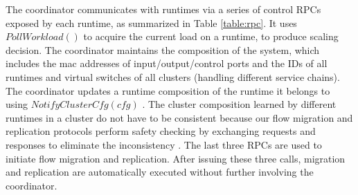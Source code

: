 The coordinator communicates with runtimes via a series of control RPCs exposed by each runtime, as summarized in Table \ref{table:rpc}. It uses $PollWorkload()$ to acquire the current load on a runtime, to produce scaling decision. The coordinator maintains the composition of the system, which includes the mac addresses of input/output/control ports and the IDs of all runtimes and virtual switches of all clusters (handling different service chains). The coordinator updates a runtime composition of the runtime it belongs to using $NotifyClusterCfg(cfg)$ . The cluster composition learned by different runtimes in a cluster do not have to be consistent because our flow migration and replication protocols perform safety checking by exchanging requests and responses to eliminate the inconsistency . The last three RPCs are used to initiate flow migration and replication. After issuing these three calls, migration and replication are automatically executed without further involving the coordinator.



